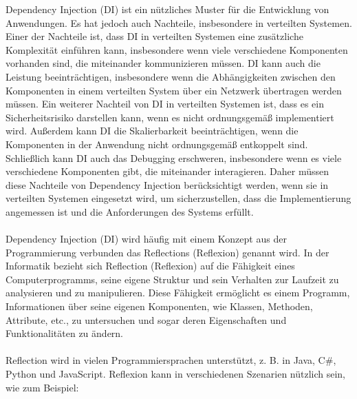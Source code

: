 \documentclass[../vs-script-first-v01.tex]{subfiles}
\begin{document}
Dependency Injection (DI) ist ein nützliches Muster für die Entwicklung von Anwendungen. Es hat jedoch auch Nachteile, insbesondere in verteilten Systemen. Einer der Nachteile ist, dass DI in verteilten Systemen eine zusätzliche Komplexität einführen kann, insbesondere wenn viele verschiedene Komponenten vorhanden sind, die miteinander kommunizieren müssen. DI kann auch die Leistung beeinträchtigen, insbesondere wenn die Abhängigkeiten zwischen den Komponenten in einem verteilten System über ein Netzwerk übertragen werden müssen. Ein weiterer Nachteil von DI in verteilten Systemen ist, dass es ein Sicherheitsrisiko darstellen kann, wenn es nicht ordnungsgemäß implementiert wird. Außerdem kann DI die Skalierbarkeit beeinträchtigen, wenn die Komponenten in der Anwendung nicht ordnungsgemäß entkoppelt sind. Schließlich kann DI auch das Debugging erschweren, insbesondere wenn es viele verschiedene Komponenten gibt, die miteinander interagieren. Daher müssen diese Nachteile von Dependency Injection berücksichtigt werden, wenn sie in verteilten Systemen eingesetzt wird, um sicherzustellen, dass die Implementierung angemessen ist und die Anforderungen des Systems erfüllt.
\\\\
Dependency Injection (DI) wird häufig mit einem Konzept aus der Programmierung verbunden das Reflections (Reflexion) genannt wird. In der Informatik bezieht sich Reflection (Reflexion) auf die Fähigkeit eines Computerprogramms, seine eigene Struktur und sein Verhalten zur Laufzeit zu analysieren und zu manipulieren. Diese Fähigkeit ermöglicht es einem Programm, Informationen über seine eigenen Komponenten, wie Klassen, Methoden, Attribute, etc., zu untersuchen und sogar deren Eigenschaften und Funktionalitäten zu ändern.
\\\\
Reflection wird in vielen Programmiersprachen unterstützt, z. B. in Java, C\#, Python und JavaScript. Reflexion kann in verschiedenen Szenarien nützlich sein, wie zum Beispiel:
\end{document}
